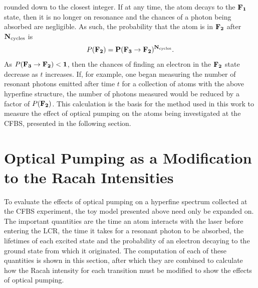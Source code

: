 rounded down to the closest integer. If at any time, the atom decays to the $\bf{F}_1$ state, then it is no longer on resonance and the chances of a photon being absorbed are negligible. As such, the probability that the atom is in $\bf{F}_2$ after $\mathrm{\bf{N}}_{\mathrm{cycles}}$ is
\begin{equation}
P(\bf{F}_2) = P(\bf{F}_3 \rightarrow \bf{F}_2)^{\mathrm{\bf{N}}_{\mathrm{cycles}}}.
\end{equation}
As $P(\bf{F}_3 \rightarrow \bf{F}_2) < 1$, then the chances of finding an electron in the $\bf{F}_2$ state decrease as $t$ increases. If, for example, one began measuring the number of resonant photons emitted after time $t$ for a collection of atoms with the above hyperfine structure, the number of photons measured would be reduced by a factor of $P(\bf{F}_2)$. This calculation is the basis for the method used in this work to measure the effect of optical pumping on the atoms being investigated at the CFBS, presented in the following section.

\section{Optical Pumping as a Modification to the Racah Intensities}
To evaluate the effects of optical pumping on a hyperfine spectrum collected at the CFBS experiment, the toy model presented above need only be expanded on. The important quantities are the time an atom interacts with the laser before entering the LCR, the time it takes for a resonant photon to be absorbed, the lifetimes of each excited state and the probability of an electron decaying to the ground state from which it originated. The computation of each of these quantities is shown in this section, after which they are combined to calculate how the Racah intensity for each transition must be modified to show the effects of optical pumping.

